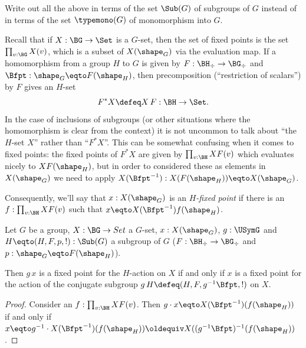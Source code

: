 \begin{xca}
  Write out all the above in terms of the set $\Sub(G)$ of subgroups of $G$ instead of in terms of the set $\typemono(G)$ of monomorphism into $G$.
\end{xca}


Recall that if $X:\BG\to\Set$ is a $G$-set, then the set of fixed points is the set $\prod_{v:\BG}X(v)$, which is a subset of $X(\sh_G)$ via the evaluation map.  If a homomorphism from a group $H$ to $G$ is given by $F:\BH_\div\to \BG_\div$ and $\Bfpt:\sh_G\eqto F(\sh_H)$, then precomposition (``restriction of scalars'') by $F$ gives an $H$-set
$$F^*X\defeq X\,F:\BH\to\Set.$$
In the case of inclusions of subgroups (or other situations where the homomorphism is clear from the context) it is not uncommon to talk about ``the $H$-set $X$'' rather than ``$F^*X$''.
This can be somewhat confusing when it comes to fixed points: the fixed points of $F^*X$ are given by $\prod_{v:\BH}XF(v)$ which evaluates nicely to $XF(\sh_H)$, but in order to considered  these as elements in $X(\sh_G)$ we need to apply $X(\Bfpt^{-1}):X(F(\sh_H))\eqto X(\sh_G)$.

Consequently, we'll say that $x:X(\sh_G)$ is an \emph{$H$-fixed point} if there is an $f:\prod_{v:\BH}XF(v)$ such that $x\eqto X(\Bfpt^{-1})f(\sh_H)$.



\begin{lemma}
  \label{lem:thereisaconjugate}
  Let $G$ be a group, $X:\BG\to Set$ a $G$-set, $x:X(\sh_G)$, $g:\USymG$ and $H\eqto (H,F,p,!):\Sub(G)$ a subgroup of $G$ ($F:\BH_\div\to \BG_\div$ and $p:\sh_G\eqto F(\sh_H)$).

Then $g\,x$ is a fixed point for the $H$-action on $X$ if and only if $x$ is a fixed point for the action  of the conjugate subgroup $g\,H\defeq(H,F,g^{-1}\Bfpt,!)$ on $X$.
\end{lemma}
\begin{proof}
  Consider an $f:\prod_{v:\BH}XF(v)$.  Then $g\cdot x\eqto X(\Bfpt^{-1})(f(\sh_H))$ if and only if $x\eqto g^{-1}\cdot X(\Bfpt^{-1})(f(\sh_H))\oldequiv X((g^{-1}\Bfpt)^{-1}(f(\sh_H))$.
\end{proof}




